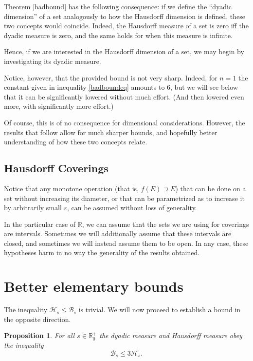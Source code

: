 \documentclass[11pt, reqno]{amsart}
\newcommand{\R}{\mathbb{R}}
\newcommand{\HH}{\mathcal{H}}
\newcommand{\BB}{\mathcal{B}}
\newtheorem{prop}{Proposition}
\begin{document}
Theorem \ref{badbound} has the following consequence: if we define the ``dyadic dimension'' of a set analogously to how the Hausdorff dimension is defined, these two concepts would coincide. Indeed, the Hausdorff measure of a set is zero iff the dyadic measure is zero, and the same holds for when this measure is infinite.

Hence, if we are interested in the Hausdorff dimension of a set, we may begin by investigating its dyadic measure.

Notice, however, that the provided bound is not very sharp. Indeed, for $n = 1$ the constant given in inequality \eqref{badboundeq} amounts to 6, but we will see below that it can be significantly lowered without much effort. (And then lowered even more, with significantly more effort.)

Of course, this is of no consequence for dimensional considerations. However, the results that follow allow for much sharper bounds, and hopefully better understanding of how these two concepts relate.

\subsection{Hausdorff Coverings}

Notice that any monotone operation (that is, $f(E) \supseteq E$) that can be done on a set without increasing its diameter, or that can be parametrized as to increase it by arbitrarily small $\varepsilon$, can be assumed without loss of generality.

In the particular case of $\R$, we can assume that the sets we are using for coverings are intervals. Sometimes we will additionally assume that these intervals are closed, and sometimes we will instead assume them to be open. In any case, these hypotheses harm in no way the generality of the results obtained.

\section{Better elementary bounds}

The inequality $\HH_s \leq \BB_s$ is trivial. We will now proceed to establish a bound in the opposite direction.

\begin{prop}\label{easybound} For all $s \in \R^+_0$ the dyadic measure and Hausdorff measure obey the inequality
\begin{equation}\label{easyboundeq}
\BB_s \leq 3 \HH_s.
\end{equation}
\end{prop}
\end{document}
